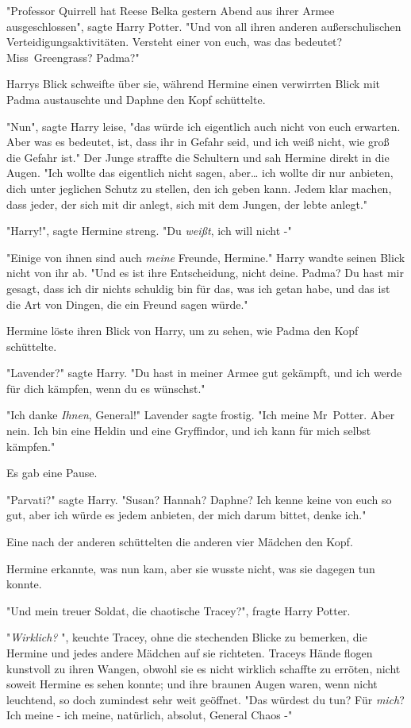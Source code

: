 {"Professor Quirrell hat Reese Belka gestern Abend aus ihrer Armee ausgeschlossen", sagte Harry Potter. "Und von all ihren anderen außerschulischen Verteidigungsaktivitäten. Versteht einer von euch, was das bedeutet? Miss~Greengrass? Padma?"

Harrys Blick schweifte über sie, während Hermine einen verwirrten Blick mit Padma austauschte und Daphne den Kopf schüttelte.

"Nun", sagte Harry leise, "das würde ich eigentlich auch nicht von euch erwarten. Aber was es bedeutet, ist, dass ihr in Gefahr seid, und ich weiß nicht, wie groß die Gefahr ist." Der Junge straffte die Schultern und sah Hermine direkt in die Augen. "Ich wollte das eigentlich nicht sagen, aber… ich wollte dir nur anbieten, dich unter jeglichen Schutz zu stellen, den ich geben kann. Jedem klar machen, dass jeder, der sich mit dir anlegt, sich mit dem Jungen, der lebte anlegt."

"Harry!", sagte Hermine streng. "Du \emph{weißt}, ich will nicht -"

"Einige von ihnen sind auch \emph{meine} Freunde, Hermine." Harry wandte seinen Blick nicht von ihr ab. "Und es ist ihre Entscheidung, nicht deine. Padma? Du hast mir gesagt, dass ich dir nichts schuldig bin für das, was ich getan habe, und das ist die Art von Dingen, die ein Freund sagen würde."

Hermine löste ihren Blick von Harry, um zu sehen, wie Padma den Kopf schüttelte.

"Lavender?" sagte Harry. "Du hast in meiner Armee gut gekämpft, und ich werde für dich kämpfen, wenn du es wünschst."

"Ich danke \emph{Ihnen}, General!" Lavender sagte frostig. "Ich meine Mr~Potter. Aber nein. Ich bin eine Heldin und eine Gryffindor, und ich kann für mich selbst kämpfen."

Es gab eine Pause.

"Parvati?" sagte Harry. "Susan? Hannah? Daphne? Ich kenne keine von euch so gut, aber ich würde es jedem anbieten, der mich darum bittet, denke ich."

Eine nach der anderen schüttelten die anderen vier Mädchen den Kopf.

Hermine erkannte, was nun kam, aber sie wusste nicht, was sie dagegen tun konnte.

"Und mein treuer Soldat, die chaotische Tracey?", fragte Harry Potter.

"\emph{Wirklich?} ", keuchte Tracey, ohne die stechenden Blicke zu bemerken, die Hermine und jedes andere Mädchen auf sie richteten. Traceys Hände flogen kunstvoll zu ihren Wangen, obwohl sie es nicht wirklich schaffte zu erröten, nicht soweit Hermine es sehen konnte; und ihre braunen Augen waren, wenn nicht leuchtend, so doch zumindest sehr weit geöffnet. "Das würdest du tun? Für \emph{mich}? Ich meine - ich meine, natürlich, absolut, General Chaos -"

}
